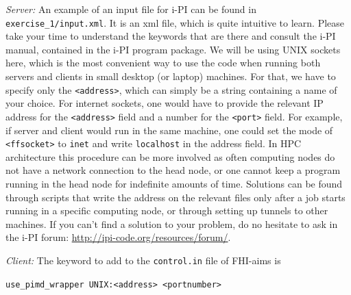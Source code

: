 \documentclass[a4paper,11pt]{scrartcl}
\begin{document}
\textit{Server:} An example of an input file for i-PI can be found in \texttt{exercise\_1/input.xml}. It is an xml file, which is quite intuitive to learn.
 Please take your time to understand the keywords that are there and consult the i-PI manual, contained in the i-PI program package.
We will be using UNIX sockets here, which is the most convenient way to use the code when running both servers and clients
in small desktop (or laptop) machines. For that, we have to specify only the \texttt{<address>}, which can simply be a string containing a name of your choice. For internet sockets, one would have to provide
the relevant IP address for the  \texttt{<address>} field and a number for the \texttt{<port>} field. For example, if server and client would run in the same machine,
one could set the mode of \texttt{<ffsocket>} to \texttt{inet} and write \texttt{localhost}  in the address field. In HPC architecture this
procedure can be more involved as often computing nodes do not have a network connection to the head node, or one cannot keep a program running 
in the head node for indefinite amounts of time. Solutions can be found through scripts that write the address on the relevant files
only after a job starts running in a specific computing node, or through setting up tunnels to other machines.
If you can't find a solution to your problem, do no hesitate to ask in the i-PI forum: \href{http://ipi-code.org/resources/forum/}{http://ipi-code.org/resources/forum/}.  





\textit{Client:} The keyword to add to the \texttt{control.in} file of FHI-aims is

\texttt{use\_pimd\_wrapper UNIX:<address> <portnumber>} 
 
\end{document}

